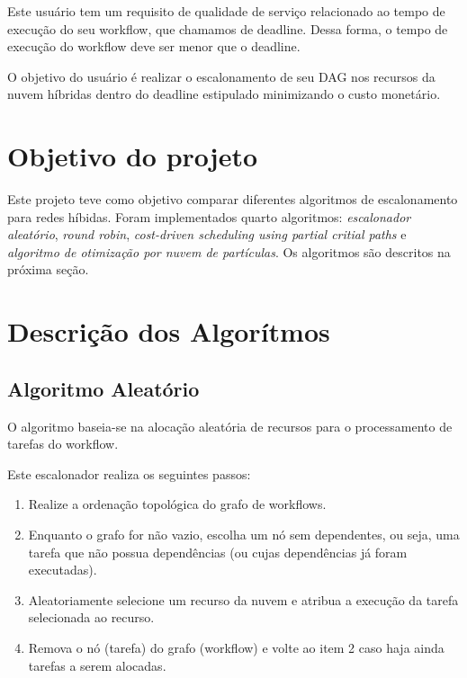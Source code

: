 \documentclass[a4paper,10pt, draft]{article}
\begin{document}
Este usuário tem um requisito de qualidade de serviço relacionado 
ao tempo de execução do seu workflow, que chamamos de deadline. Dessa forma, o tempo 
de execução do workflow deve ser menor que o deadline.

O objetivo do usuário é realizar o escalonamento de seu DAG nos recursos da 
nuvem híbridas dentro do deadline estipulado minimizando o custo monetário.

\section{Objetivo do projeto}

Este projeto teve como objetivo comparar diferentes algoritmos de escalonamento 
para redes híbidas. Foram implementados quarto algoritmos: \emph{escalonador aleatório}, \emph{round robin},
\emph{cost-driven scheduling using partial critial paths} e \emph{algoritmo de otimização por nuvem de partículas}.
Os algoritmos são descritos na próxima seção.

\section{Descrição dos Algorítmos}

\subsection{Algoritmo Aleatório}

O algoritmo baseia-se na alocação aleatória de recursos para o processamento de tarefas do workflow.

Este escalonador realiza os seguintes passos:

\begin{enumerate}

    \item Realize a ordenação topológica do grafo de workflows.

    \item Enquanto o grafo for não vazio, escolha um nó sem dependentes, ou seja, uma tarefa que não possua dependências 
(ou cujas dependências já foram executadas).

    \item Aleatoriamente selecione um recurso da nuvem e atribua a execução da tarefa selecionada ao recurso.

    \item Remova o nó (tarefa) do grafo (workflow) e volte ao item 2 caso haja ainda tarefas a serem alocadas.

\end{enumerate}
\end{document}
